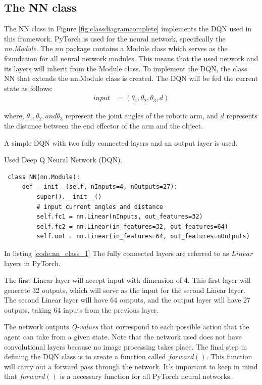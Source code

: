 \documentclass[12pt,oneside]{article}
\begin{document}
\subsection{The NN class}      
The NN class in Figure \ref{fig:classdiagramcomplete} implements the DQN used in this framework.         
PyTorch \cite{pytorch} is used for the neural network, specifically the \textit{nn.Module}. 
The $nn$ package contains a Module class which serves as the foundation for all neural network modules. This means that the used network and its layers will inherit from the Module class. To implement the DQN, the class NN that extends the nn.Module class is created. The DQN will be fed the current state as follows:
\begin{align}
	input &= (\theta_1, \theta_2, \theta_3, d) \label{eq:1}
\end{align}

where, $\theta_1, \theta_2, and \theta_3$ represent the joint angles of the robotic arm, and $d$ represents the distance between the end effector of the arm and the object. 

A simple DQN with two fully connected layers and an output layer is used.
\begin{listing}[htbp]
\caption{Used Deep Q Neural Network (DQN).}
\label{code:nn_class_1}
\begin{verbatim}
 class NN(nn.Module):
     def __init__(self, nInputs=4, nOutputs=27):
         super().__init__()
         # input current angles and distance
         self.fc1 = nn.Linear(nInputs, out_features=32)
         self.fc2 = nn.Linear(in_features=32, out_features=64)
         self.out = nn.Linear(in_features=64, out_features=nOutputs)
\end{verbatim}
\end{listing} 

In listing \ref{code:nn_class_1} The fully connected layers are referred to as $Linear$ layers in PyTorch.

The first Linear layer will accept input with dimension of 4. This first layer will generate 32 outputs, which will serve as the input for the second Linear layer. The second Linear layer will have 64 outputs, and the output layer will have 27 outputs, taking 64 inputs from the previous layer.

The network outputs \textit{Q-values} that correspond to each possible action that the agent can take from a given state. Note that the network used does not have convolutional layers because no image processing takes place.
The final step in defining the DQN class is to create a function called $forward()$. This function will carry out a forward pass through the network. It's important to keep in mind that $forward()$ is a necessary function for all PyTorch neural networks.
\end{document}
